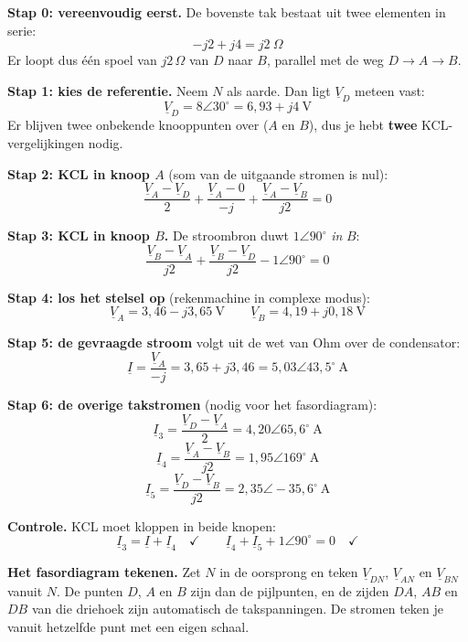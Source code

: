 \documentclass[a4paper,11pt]{article}
\begin{document}
\begin{oefenblok}

    \textbf{Stap 0: vereenvoudig eerst.} De bovenste tak bestaat uit twee elementen in serie:
    \[-j2 + j4 = j2\ \Omega\]
    Er loopt dus één spoel van $j2\,\Omega$ van $D$ naar $B$, parallel met de weg $D \to A \to B$.

    \textbf{Stap 1: kies de referentie.} Neem $N$ als aarde. Dan ligt $\underline{V}_D$ meteen vast:
    \[\underline{V}_D = 8\angle 30^\circ = 6{,}93 + j4\ \text{V}\]
    Er blijven twee onbekende knooppunten over ($A$ en $B$), dus je hebt \textbf{twee}
    KCL-vergelijkingen nodig.

    \textbf{Stap 2: KCL in knoop $A$} (som van de uitgaande stromen is nul):
    \[\frac{\underline{V}_A - \underline{V}_D}{2} + \frac{\underline{V}_A - 0}{-j} + \frac{\underline{V}_A - \underline{V}_B}{j2} = 0\]

    \textbf{Stap 3: KCL in knoop $B$.} De stroombron duwt $1\angle 90^\circ$ \emph{in} $B$:
    \[\frac{\underline{V}_B - \underline{V}_A}{j2} + \frac{\underline{V}_B - \underline{V}_D}{j2} - 1\angle 90^\circ = 0\]

    \textbf{Stap 4: los het stelsel op} (rekenmachine in complexe modus):
    \[\underline{V}_A = 3{,}46 - j3{,}65\ \text{V} \qquad \underline{V}_B = 4{,}19 + j0{,}18\ \text{V}\]

    \textbf{Stap 5: de gevraagde stroom} volgt uit de wet van Ohm over de condensator:
    \[\underline{I} = \frac{\underline{V}_A}{-j} = 3{,}65 + j3{,}46 = \boxed{5{,}03\angle 43{,}5^\circ\ \text{A}}\]

    \textbf{Stap 6: de overige takstromen} (nodig voor het fasordiagram):
    \[\underline{I}_3 = \frac{\underline{V}_D - \underline{V}_A}{2} = 4{,}20\angle 65{,}6^\circ\ \text{A}\]
    \[\underline{I}_4 = \frac{\underline{V}_A - \underline{V}_B}{j2} = 1{,}95\angle 169^\circ\ \text{A}\]
    \[\underline{I}_5 = \frac{\underline{V}_D - \underline{V}_B}{j2} = 2{,}35\angle -35{,}6^\circ\ \text{A}\]

    \textbf{Controle.} KCL moet kloppen in beide knopen:
    \[\underline{I}_3 = \underline{I} + \underline{I}_4 \quad\checkmark \qquad
        \underline{I}_4 + \underline{I}_5 + 1\angle 90^\circ = 0 \quad\checkmark\]

    \textbf{Het fasordiagram tekenen.} Zet $N$ in de oorsprong en teken $\underline{V}_{DN}$,
    $\underline{V}_{AN}$ en $\underline{V}_{BN}$ vanuit $N$. De punten $D$, $A$ en $B$ zijn dan de
    pijlpunten, en de zijden $DA$, $AB$ en $DB$ van die driehoek zijn automatisch de takspanningen.
    De stromen teken je vanuit hetzelfde punt met een eigen schaal.
\end{oefenblok}
\end{document}
